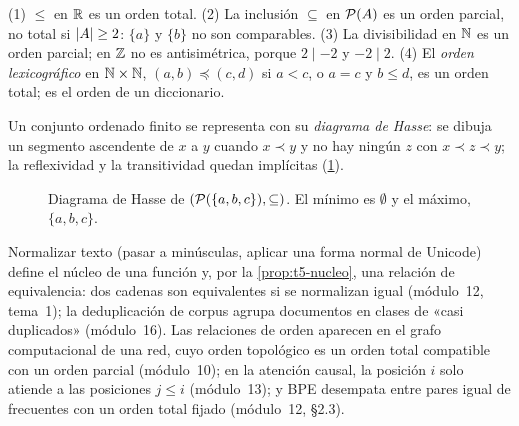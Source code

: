 \begin{ejemplo}\label{ej:t5-ordenes}
(1) $\le$ en $\mathbb{R}$ es un orden total. (2) La inclusión $\subseteq$ en $\mathcal{P}(A)$ es un orden parcial, no total si $\lvert A\rvert\ge2$: $\{a\}$ y $\{b\}$ no son comparables. (3) La divisibilidad en $\mathbb{N}$ es un orden parcial; en $\mathbb{Z}$ no es antisimétrica, porque $2\mid-2$ y $-2\mid2$. (4) El \emph{orden lexicográfico} en $\mathbb{N}\times\mathbb{N}$, $(a,b)\preceq(c,d)$ si $a<c$, o $a=c$ y $b\le d$, es un orden total; es el orden de un diccionario.
\end{ejemplo}

Un conjunto ordenado finito se representa con su \emph{diagrama de Hasse}: se dibuja un segmento ascendente de $x$ a $y$ cuando $x\prec y$ y no hay ningún $z$ con $x\prec z\prec y$; la reflexividad y la transitividad quedan implícitas (\cref{fig:t5-hasse}).

\begin{figure}[h]
\centering
{}
\caption{Diagrama de Hasse de $(\mathcal{P}(\{a,b,c\}),\subseteq)$. El mínimo es $\emptyset$ y el máximo, $\{a,b,c\}$.}
\label{fig:t5-hasse}
\end{figure}

\begin{observacion}
Normalizar texto (pasar a minúsculas, aplicar una forma normal de Unicode) define el núcleo de una función y, por la \cref{prop:t5-nucleo}, una relación de equivalencia: dos cadenas son equivalentes si se normalizan igual (módulo~12, tema~1); la deduplicación de corpus agrupa documentos en clases de «casi duplicados» (módulo~16). Las relaciones de orden aparecen en el grafo computacional de una red, cuyo orden topológico es un orden total compatible con un orden parcial (módulo~10); en la atención causal, la posición $i$ solo atiende a las posiciones $j\le i$ (módulo~13); y BPE desempata entre pares igual de frecuentes con un orden total fijado (módulo~12, §2.3).
\end{observacion}

